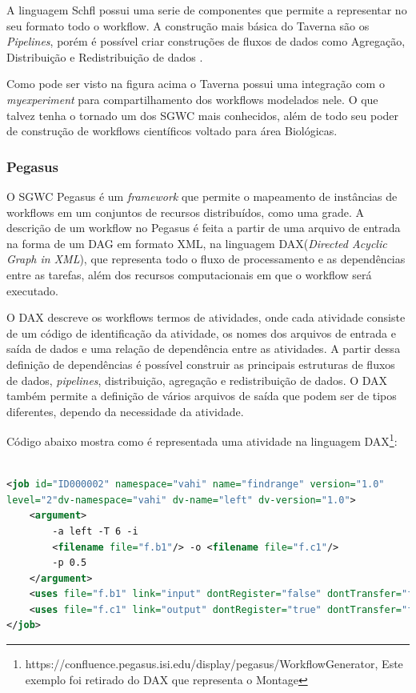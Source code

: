		A linguagem Schfl possui uma serie de componentes que permite a representar no seu formato todo o workflow. A construção mais básica do Taverna são os \textit{Pipelines}, porém é possível criar construções de fluxos de dados como Agregação, Distribuição e Redistribuição de dados \cite{Teixeira2013}.
 	
 		Como pode ser visto na figura acima o Taverna possui uma integração com o \textit{myexperiment} para compartilhamento dos workflows modelados nele. O que talvez tenha o tornado um dos SGWC mais conhecidos, além de todo seu poder de construção de workflows científicos voltado para área Biológicas.
		
		\subsubsection{Pegasus}
		
		O SGWC Pegasus é um \textit{framework} que permite o mapeamento de instâncias de workflows em um conjuntos de recursos distribuídos, como uma grade. A descrição de um workflow no Pegasus é feita a partir de uma arquivo de entrada na forma de um DAG em formato XML, na linguagem DAX(\textit{Directed Acyclic Graph in XML}), que representa todo o fluxo de processamento e as dependências entre as tarefas, além dos recursos computacionais em que o workflow será executado\cite{Teixeira2013}.
		
		O DAX descreve os workflows termos de atividades, onde cada atividade consiste de um código de identificação da atividade, os nomes dos arquivos de entrada e saída de dados e uma relação de dependência entre as atividades. A partir dessa definição de dependências é possível construir as principais estruturas de fluxos de dados, \textit{pipelines}, distribuição, agregação e redistribuição de dados. O DAX também permite a definição de vários arquivos de saída que podem ser de tipos diferentes, dependo da necessidade da atividade\cite{Teixeira2013}. 
		
		 Código abaixo mostra como é representada uma atividade na linguagem DAX\footnote{https://confluence.pegasus.isi.edu/display/pegasus/WorkflowGenerator, Este exemplo foi retirado do DAX que representa o Montage}:
		

\begin{lstlisting}[language=XML, caption=Exemplo de uma atividade DAX]

<job id="ID000002" namespace="vahi" name="findrange" version="1.0" 
level="2"dv-namespace="vahi" dv-name="left"	dv-version="1.0">
	<argument>
		-a left -T 6 -i 
		<filename file="f.b1"/> -o <filename file="f.c1"/>
		-p 0.5
	</argument>
	<uses file="f.b1" link="input" dontRegister="false" dontTransfer="false" temporaryHint="true"/>
	<uses file="f.c1" link="output" dontRegister="true" dontTransfer="false" temporaryHint="true"/>
</job>

\end{lstlisting}

